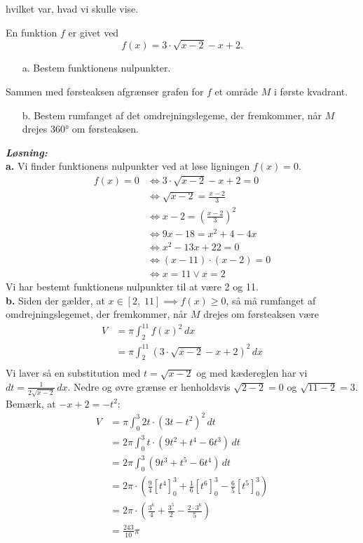 \documentclass{article}
\newcommand{\sol}{\setlength{\parindent}{0cm}\textbf{\textit{Løsning:}}\setlength{\parindent}{1cm}}
\begin{document}
hvilket var, hvad vi skulle vise.
\begin{question}{}{}
En funktion $f$ er givet ved
$$f(x)=3\cdot\sqrt{x-2}-x+2.$$
\begin{itemize}
  \item[a.] Bestem funktionens nulpunkter.
\end{itemize}
Sammen med førsteaksen afgrænser grafen for $f$ et område $M$ i første kvadrant.
\begin{itemize}
  \item[b.] Bestem rumfanget af det omdrejningslegeme, der fremkommer, når $M$ drejes 360° om førsteaksen.
\end{itemize}
\end{question}
\sol \\
\textbf{a.}
Vi finder funktionens nulpunkter ved at løse ligningen $f(x)= 0$.
\begin{equation*}
\begin{split}
  f(x)= 0 &\iff 3 \cdot \sqrt{x-2} -x+2=0\\ 
  &\iff \sqrt{x-2} =\frac{x-2}{3}\\ 
  &\iff x-2=\left(\frac{x-2}{3}\right)^2\\
  &\iff 9x-18=x^2+4-4x\\ 
  &\iff x^2-13x+22=0\\ 
  &\iff \left(x-11\right) \cdot \left(x-2\right) =0\\ 
  &\iff x=11 \lor x=2
\end{split}
\end{equation*}
Vi har bestemt funktionens nulpunkter til at være 2 og 11.\\[1ex]
\textbf{b.}
Siden der gælder, at $x \in [2,\;11] \implies f(x)\geq 0$, så må rumfanget af omdrejningslegemet, der fremkommer, når $M$ drejes om førsteaksen være
\begin{equation*}
\begin{split}
  V&=\pi \int_{2}^{11} f(x)^2 \,dx \\ 
  &=\pi \int_{2}^{11} \left(3 \cdot \sqrt{x-2} -x+2 \right)^2  \,dx \\ 
\end{split}
\end{equation*}
Vi laver så en substitution med $t=\sqrt{x-2} $ og med kædereglen har vi $dt=\frac{1}{2 \sqrt{x-2} } \,dx$. 
Nedre og øvre grænse er henholdsvis $\sqrt{2-2} =0$ og $\sqrt{11-2} =3$.
Bemærk, at $-x+2=-t^2$:
\begin{equation*}
\begin{split}
  V&=\pi \int_{0}^{3} 2t \cdot \left(3t-t^2\right)^2 \,dt \\ 
  &=2 \pi \int_{0}^{3} t \cdot \left(9t^2+t^4-6t^3\right)  \,dt \\ 
  &=2\pi \int_{0}^{3} \left(9t^3+t^5-6t^4\right)  \,dt \\ 
  &=2\pi \cdot \left(\frac{9}{4}\left[t^4\right]_{0}^3+\frac{1}{6}\left[t^6\right]_{0}^3-\frac{6}{5}\left[t^5\right]_{0}^3\right) \\ 
  &=2 \pi \cdot \left(\frac{3^6}{4}+\frac{3^5}{2}-\frac{2 \cdot 3^6}{5}\right) \\ 
  &=\frac{243}{10}\pi
\end{split}
\end{equation*}
\end{document}
